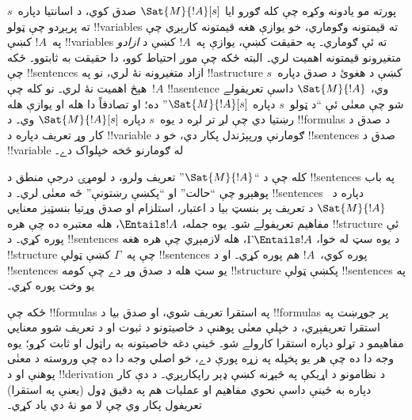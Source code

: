 \documentclass[../../../include/open-logic-section]{subfiles}
\begin{document}


پورته مو يادونه وکړه چې کله ګورو ايا $\Sat{M}{!A}[s]$ صدق کوي، د
اسانتيا دپاره~$s$ ته پرېږدو چې ټولو !!{variable}s ته قيمتونه
وګوماري، خو يوازې هغه قيمتونه کارېږي چې په~$!A$ کښې
!!{variable}s ته ئې ګوماري۔ په حقيقت کښې، يوازې په~$!A$ کښې د
\emph{ازادو} متغيرونو قيمتونه اهميت لري۔ البته ځکه چې موږ احتياط
کوو، دا حقيقت به ثابتوو۔ ځکه چې !!{sentence}s ازاد متغيرونه نۀ
لري، نو په !!a{structure} کښې د هغوئ د صدق دپاره~$s$ هېڅ اهميت نۀ
لري۔ نو کله چې~$!A$ !!a{sentence} وي، $\Sat{M}{!A}$ داسې تعريفولے
شو چې معنٰی ئې ``د ټولو~$s$ دپاره $\Sat{M}{!A}[s]$'' ده؛ او تصادفاً
دا هله او يوازې هله رښتيا دي چې لږ تر لږه د يوه~$s$ دپاره
$\Sat{M}{!A}[s]$ وي۔ د !!{formula}s د صدق د کار وړ تعريف دپاره د
!!{variable} ګومارنې ورپېژندل پکار دي، خو د !!{sentence}s صدق د
!!{variable} له ګومارنو څخه خپلواک دے۔

کله چې د ``$\Sat{M}{!A}$'' تعريف ولرو، د لومړۍ درجې منطق د
!!{sentence}s په باب پوهېږو چې ``حالت'' او ``پکښې رښتونې'' څه معنٰی
لري۔ د !!{sentence}s دپاره د~$\Sat{M}{!A}$ د تعريف پر بنسټ بيا د
اعتبار، استلزام او صدق وړتيا بنسټيز معنايي مفاهيم تعريفولے شو۔ يوه
جمله، $\Entails !A$، هله معتبره ده چې هره !!{structure} ئې پوره
کړي۔ د !!{sentence}s د يوه سټ له خوا، $\Gamma \Entails !A$،
هله لازمېږي چې هره هغه !!{structure} چې په~$\Gamma$ کښې ټولې
!!{sentence}s پوره کوي،~$!A$ هم پوره کړي۔ او د !!{sentence}s يو سټ
هله د صدق وړ دے چې کومه !!{structure} پکښې ټولې !!{sentence}s په
يو وخت پوره کړي۔

ځکه چې !!{formula}s په استقرا تعريف شوي، او صدق بيا د !!{formula}s
پر جوړښت په استقرا تعريفېږي، د خپلې معنٰی پوهنې د خاصيتونو د ثبوت
او د تعريف شوو معنايي مفاهيمو د تړلو دپاره استقرا کارولے شو۔ ځينې
دغه خاصيتونه به راټول او ثابت کړو؛ يوه وجه دا ده چې هر يو پخپله په
زړه پورې دے، خو اصلي وجه دا ده چې وروسته د معنٰی پوهنې او د
!!{derivation} د نظامونو د اړيکې په څېړنه کښې ډېر راپکارېږي۔ د دې
کار دپاره به ځينې داسې نحوي مفاهيم او عمليات هم په دقيق ډول (يعنې
په استقرا) تعريفول پکار وي چې لا مو نۀ دي ياد کړي۔
\end{document}

